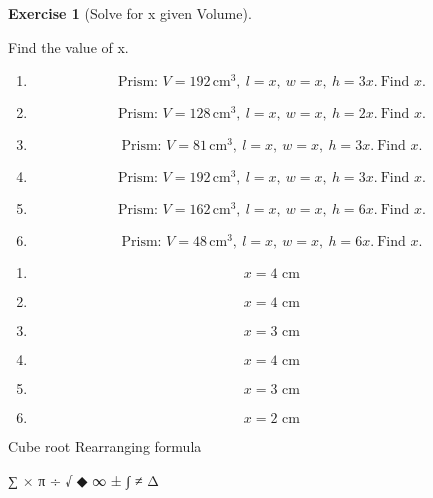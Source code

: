\documentclass[
  letterpaper,
  DIV=11,
  numbers=noendperiod]{scrreprt}
\theoremstyle{definition}
\newtheorem{exercise}{Exercise}[chapter]
\theoremstyle{remark}
\begin{document}
\begin{exercise}[Solve for x given
Volume]\protect\hypertarget{exr-alg-4}{}\label{exr-alg-4}

Find the value of x.

\begin{enumerate}
\def\labelenumi{\alph{enumi})}
\item
  \[\text{Prism: }V=192\,\text{cm}^{3},\ l=x,\ w=x,\ h=3x.\ \text{Find }x.\]
\item
  \[\text{Prism: }V=128\,\text{cm}^{3},\ l=x,\ w=x,\ h=2x.\ \text{Find }x.\]
\item
  \[\text{Prism: }V=81\,\text{cm}^{3},\ l=x,\ w=x,\ h=3x.\ \text{Find }x.\]
\item
  \[\text{Prism: }V=192\,\text{cm}^{3},\ l=x,\ w=x,\ h=3x.\ \text{Find }x.\]
\item
  \[\text{Prism: }V=162\,\text{cm}^{3},\ l=x,\ w=x,\ h=6x.\ \text{Find }x.\]
\item
  \[\text{Prism: }V=48\,\text{cm}^{3},\ l=x,\ w=x,\ h=6x.\ \text{Find }x.\]
\end{enumerate}

\begin{tcolorbox}[enhanced jigsaw, opacitybacktitle=0.6, coltitle=black, arc=.35mm, colframe=quarto-callout-tip-color-frame, colback=white, bottomrule=.15mm, left=2mm, colbacktitle=quarto-callout-tip-color!10!white, titlerule=0mm, opacityback=0, title=\textcolor{quarto-callout-tip-color}{\faLightbulb}\hspace{0.5em}{🔍 View Solution}, leftrule=.75mm, breakable, rightrule=.15mm, bottomtitle=1mm, toptitle=1mm, toprule=.15mm]

\begin{enumerate}
\def\labelenumi{\alph{enumi})}
\item
  \[x=4\text{ cm}\]
\item
  \[x=4\text{ cm}\]
\item
  \[x=3\text{ cm}\]
\item
  \[x=4\text{ cm}\]
\item
  \[x=3\text{ cm}\]
\item
  \[x=2\text{ cm}\]
\end{enumerate}

\end{tcolorbox}

{Cube root} {Rearranging formula}

\end{exercise}

∑ × π ÷ √ ◆ ∞ ± ∫ ≠ Δ
\end{document}
